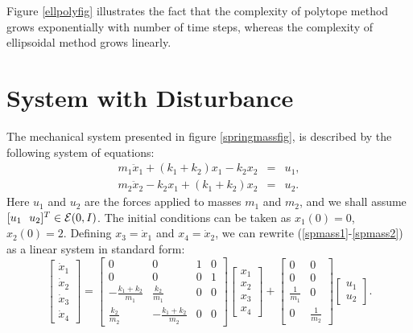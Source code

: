 

Figure \ref{ellpolyfig}  illustrates  the fact that the
complexity of polytope method grows exponentially with number of time
steps, whereas the complexity of ellipsoidal method grows linearly.



\section{System with Disturbance}
The mechanical system presented in figure \ref{springmassfig}, is described
by the following system of equations:
\begin{eqnarray}
m_1\ddot{x}_1+(k_1+k_2)x_1-k_2x_2 & = & u_1, \label{spmass1}\\
m_2\ddot{x}_2-k_2x_1+(k_1+k_2)x_2 & = & u_2 . \label{spmass2}
\end{eqnarray}
Here $u_1$ and $u_2$ are the forces applied to masses $m_1$ and $m_2$,
and we shall assume $[u_1 ~~ u_2]^T\in\EE(0,I)$.
The initial conditions can be taken as $x_1(0)=0$, $x_2(0)=2$.
Defining $x_3=\dot{x}_1$ and $x_4=\dot{x}_2$, we can rewrite
(\ref{spmass1}-\ref{spmass2}) as a linear system in standard form:
\begin{equation}
\left[\begin{array}{c}
\dot{x}_1 \\
\dot{x}_2 \\
\dot{x}_3 \\
\dot{x}_4 \end{array}\right] = \left[\begin{array}{cccc}
0 & 0 & 1 & 0\\
0 & 0 & 0 & 1\\
-\frac{k_1+k_2}{m_1} & \frac{k_2}{m_1} & 0 & 0\\
\frac{k_2}{m_2} & -\frac{k_1+k_2}{m_2} & 0 & 0\end{array}\right]
\left[\begin{array}{c}
x_1 \\
x_2 \\
x_3 \\
x_4 \end{array}\right] + \left[\begin{array}{cc}
0 & 0\\
0 & 0\\
\frac{1}{m_1} & 0\\
0 & \frac{1}{m_2}\end{array}\right]\left[\begin{array}{c}
u_1\\
u_2\end{array}\right]. \label{spmassls}
\end{equation}
